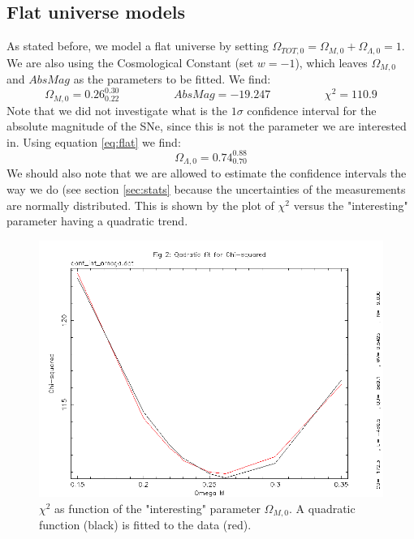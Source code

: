 \documentclass[11pt]{article}
\begin{document}
\subsection{Flat universe models} \label{sec:flat}
As stated before, we model a flat universe by setting $\Omega_{TOT,0} = \Omega_{M,0} + \Omega_{\Lambda,0} = 1$. We are also using the Cosmological Constant (set $w = -1$), which leaves  $\Omega_{M,0}$ and $AbsMag$ as the parameters to be fitted. We find: 
\begin{equation}
	\Omega_{M,0} = 0.26^{0.30}_{0.22} 
	\hspace{2cm}
	AbsMag = -19.247
	\hspace{2cm}
	\chi^2 = 110.9
	\label{res:flatM}
\end{equation}
Note that we did not investigate what is the $1\sigma$ confidence interval for the absolute magnitude of the SNe, since this is not the parameter we are interested in. Using equation \eqref{eq:flat} we find: 
\begin{equation}
	\Omega_{\Lambda,0} = 0.74^{0.88}_{0.70} 
	\label{res:flatL}
\end{equation}
We should also note that we are allowed to estimate the confidence intervals the way we do (see section \ref{sec:stats} because the uncertainties of the measurements are normally distributed. This is shown by the plot of $\chi^2$ versus the "interesting" parameter having a quadratic trend. 

\begin{figure}[htbp]
	\centering
	\includegraphics[width=0.8\linewidth]{quad.png}
	\caption{$\chi^2$ as function of the "interesting" parameter $\Omega_{M,0}$. A quadratic function (black) is fitted to the data (red).}
	\label{fig:quad}
\end{figure}
\end{document}
